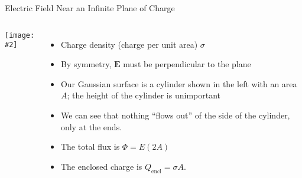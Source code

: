 \documentclass[12pt,aspectratio=169]{beamer}
\newcommand{\pic}[2]{\texttt{[image: \#2]}}
\newcommand{\mb}[1]{\mathbf{#1}}
\begin{document}
%
%

\begin{frame}{Electric Field Near an Infinite Plane of Charge}
  \begin{columns}
    \pic{1.3}{elec_gauss_figure9.jpg}

    \begin{itemize}
    \item Charge density (charge per unit area) $\sigma$
    \item By symmetry, $\mb{E}$ must be perpendicular to the plane
    \item Our Gaussian surface is a cylinder shown in the left with an area
      $A$; the height of the cylinder is unimportant
    \item We can see that nothing ``flows out'' of the side of the cylinder,
      only at the ends.
    \item The total flux is $\Phi=E(2A)$
    \item The enclosed charge is $Q_\mathrm{encl}=\sigma A$.
    \end{itemize}
  \end{columns}
\end{frame}
\end{document}
